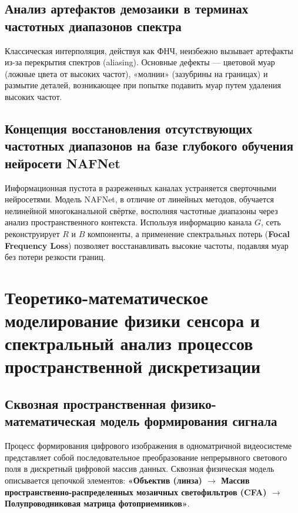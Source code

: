 \documentclass[12pt,a4paper]{article}
\begin{document}
\subsection{Анализ артефактов демозаики в терминах частотных диапазонов спектра}
Классическая интерполяция, действуя как ФНЧ, неизбежно вызывает артефакты из-за перекрытия спектров (aliasing). Основные дефекты — цветовой муар (ложные цвета от высоких частот), «молнии» (зазубрины на границах) и размытие деталей, возникающее при попытке подавить муар путем удаления высоких частот.

\subsection{Концепция восстановления отсутствующих частотных диапазонов на базе глубокого обучения нейросети NAFNet}
Информационная пустота в разреженных каналах устраняется сверточными нейросетями. Модель NAFNet, в отличие от линейных методов, обучается нелинейной многоканальной свёртке, восполняя частотные диапазоны через анализ пространственного контекста. Используя информацию канала $G$, сеть реконструирует $R$ и $B$ компоненты, а применение спектральных потерь (\textbf{Focal Frequency Loss}) позволяет восстанавливать высокие частоты, подавляя муар без потери резкости границ.

\section{Теоретико-математическое моделирование физики сенсора и спектральный анализ процессов пространственной дискретизации}

\subsection{Сквозная пространственная физико-математическая модель формирования сигнала}
Процесс формирования цифрового изображения в одноматричной видеосистеме представляет собой последовательное преобразование непрерывного светового поля в дискретный цифровой массив данных. Сквозная физическая модель описывается цепочкой элементов: \textbf{«Объектив (линза) $\to$ Массив пространственно-распределенных мозаичных светофильтров (CFA) $\to$ Полупроводниковая матрица фотоприемников»}.
\end{document}
